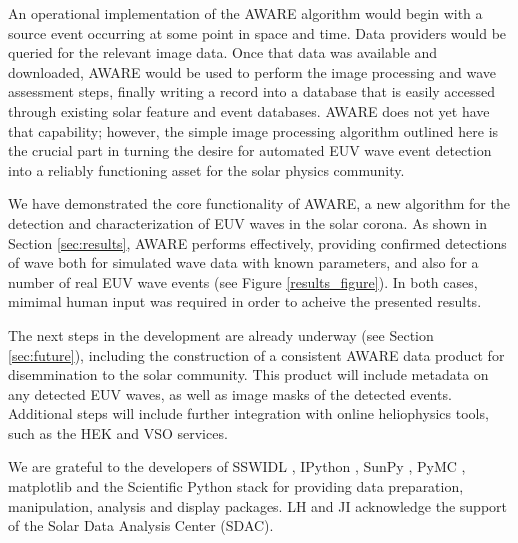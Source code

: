 \documentclass[namedreferences]{solarphysics}
\begin{document}
\begin{article}
An operational implementation of the AWARE algorithm would begin with
a source event occurring at some point in space and time.  Data
providers would be queried for the relevant image data.  Once that
data was available and downloaded, AWARE would be used to perform the
image processing and wave assessment steps, finally writing a record
into a database that is easily accessed through existing solar feature
and event databases.  AWARE does not yet have that capability;
however, the simple image processing algorithm outlined here is the
crucial part in turning the desire for automated EUV wave event
detection into a reliably functioning asset for the solar physics
community.

We have demonstrated the core functionality of AWARE, a new algorithm
for the detection and characterization of EUV waves in the solar
corona. As shown in Section \ref{sec:results}, AWARE performs
effectively, providing confirmed detections of wave both for simulated
wave data with known parameters, and also for a number of real EUV
wave events (see Figure \ref{results_figure}). In both cases, mimimal
human input was required in order to acheive the presented results.

The next steps in the development are already underway (see Section
\ref{sec:future}), including the construction of a consistent AWARE
data product for disemmination to the solar community. This product
will include metadata on any detected EUV waves, as well as image
masks of the detected events. Additional steps will include further
integration with online heliophysics tools, such as the HEK and VSO
services.

\begin{acks}
We are grateful to the developers of SSWIDL \citep{ssw}, IPython
\citep{ipython}, SunPy \citep{mumford-proc-scipy-2013}, PyMC
\citep{pymc2010}, matplotlib \citep{Hunter:2007:matplotlib} and the
Scientific Python stack for providing data preparation, manipulation,
analysis and display packages.  LH and JI acknowledge the support of
the Solar Data Analysis Center (SDAC).\end{acks}







\end{article} 
\end{document}
